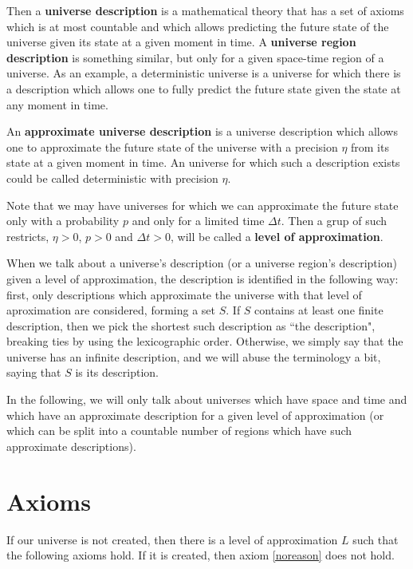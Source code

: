 \documentclass[a4paper
,draft
]{article}
\newcommand{\svn}[2][]{\todo[author=Virgil,color=red!25!white,#1]{#2}}
\newcommand{\definitie}[1]{\textbf{#1}}
\newcommand{\ghilimele}[1]{``#1"}
\begin{document}
Then a \definitie{universe description} is a mathematical theory that has a set of axioms which is at most countable and which allows predicting the future state of the universe given its state at a given moment in time. A \definitie{universe region description} is something similar, but only for a given space-time region of a universe. As an example, a deterministic universe is a universe for which there is a description which allows one to fully predict the future state given the state at any moment in time.

An \definitie{approximate universe description} is a universe description which allows one to approximate the future state of the universe with a precision $\eta$ from its state at a given moment in time. An universe for which such a description exists could be called deterministic with precision $\eta$.

Note that we may have universes for which we can approximate the future state only with a probability $p$ and only for a limited time $\Delta t$. Then a grup of such restricts, $\eta>0$, $p>0$ and $\Delta t>0$, will be called a \definitie{level of approximation}.

When we talk about a universe's description (or a universe region's description) given a level of approximation, the description is identified in the following way: first, only descriptions which approximate the universe with that level of aproximation are considered, forming a set $S$. If $S$ contains at least one finite description, then we pick the shortest such description as \ghilimele{the description}, breaking ties by using the lexicographic order. Otherwise, we simply say that the universe has an infinite description, and we will abuse the terminology a bit, saying that $S$ is its description.

In the following, we will only talk about universes which have space and time and which have an approximate description for a given level of approximation (or which can be split into a countable number of regions which have such approximate descriptions).

\section{Axioms}

If our universe is not created, then there is a level of approximation $L$ such that the following axioms hold. If it is created, then axiom \ref{noreason} does not hold.\svn{Explain why.}
\end{document}
